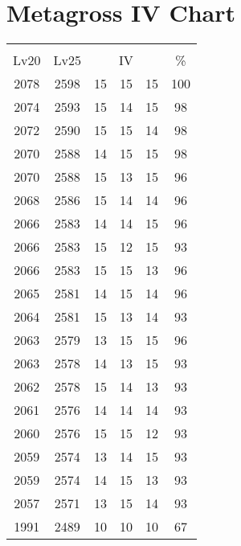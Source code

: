 \documentclass{article}%
\begin{document}
%
\normalsize%
\section{Metagross IV Chart}%
\label{sec:Metagross IV Chart}%
\renewcommand{\arraystretch}{1.5}%
\begin{tabular}{|c|c|c|c|c|c|}%
\hline%
\multicolumn{6}{|c|}{\textcolor{white}{ 
\linebreak{Metagross}
}%
\cellcolor{black}}\\%
\multicolumn{1}{|c}{Lv20}&\multicolumn{1}{c|}{Lv25}&\multicolumn{3}{c|}{IV}&\multicolumn{1}{|c|}{\%}\\%
\hline%
\rowcolor{color100}%
2078&2598&15&15&15&100\\%
\hline%
\rowcolor{color98}%
2074&2593&15&14&15&98\\%
\hline%
\rowcolor{color98}%
2072&2590&15&15&14&98\\%
\hline%
\rowcolor{color98}%
2070&2588&14&15&15&98\\%
\hline%
\rowcolor{color96}%
2070&2588&15&13&15&96\\%
\hline%
\rowcolor{color96}%
2068&2586&15&14&14&96\\%
\hline%
\rowcolor{color96}%
2066&2583&14&14&15&96\\%
\hline%
\rowcolor{color93}%
2066&2583&15&12&15&93\\%
\hline%
\rowcolor{color96}%
2066&2583&15&15&13&96\\%
\hline%
\rowcolor{color96}%
2065&2581&14&15&14&96\\%
\hline%
\rowcolor{color93}%
2064&2581&15&13&14&93\\%
\hline%
\rowcolor{color96}%
2063&2579&13&15&15&96\\%
\hline%
\rowcolor{color93}%
2063&2578&14&13&15&93\\%
\hline%
\rowcolor{color93}%
2062&2578&15&14&13&93\\%
\hline%
\rowcolor{color93}%
2061&2576&14&14&14&93\\%
\hline%
\rowcolor{color93}%
2060&2576&15&15&12&93\\%
\hline%
\rowcolor{color93}%
2059&2574&13&14&15&93\\%
\hline%
\rowcolor{color93}%
2059&2574&14&15&13&93\\%
\hline%
\rowcolor{color93}%
2057&2571&13&15&14&93\\%
\hline%
\rowcolor{color91}%
1991&2489&10&10&10&67\\%
\end{tabular}

%
\end{document}
